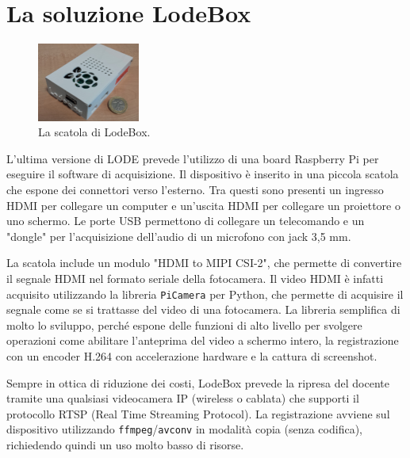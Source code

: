 \section{La soluzione LodeBox}
\label{sec:intro_lodebox}

\begin{figure}
	\vspace{-12pt}
	\includegraphics[width=0.3\textwidth]{res/lodebox}
	\caption{\label{fig:lodebox} La scatola di LodeBox.}
\end{figure}

L'ultima versione di LODE prevede l'utilizzo di una board Raspberry Pi per eseguire il software di acquisizione. Il dispositivo è inserito in una piccola scatola che espone dei connettori verso l'esterno. Tra questi sono presenti un ingresso HDMI per collegare un computer e un'uscita HDMI per collegare un proiettore o uno schermo. Le porte USB permettono di collegare un telecomando e un "dongle" per l'acquisizione dell'audio di un microfono con jack 3,5 mm.

La scatola include un modulo "HDMI to MIPI CSI-2", che permette di convertire il segnale HDMI nel formato seriale della fotocamera. Il video HDMI è infatti acquisito utilizzando la libreria \texttt{PiCamera} per Python, che permette di acquisire il segnale come se si trattasse del video di una fotocamera. La libreria semplifica di molto lo sviluppo, perché espone delle funzioni di alto livello per svolgere operazioni come abilitare l'anteprima del video a schermo intero, la registrazione con un encoder H.264\footnotemark{} con accelerazione hardware e la cattura di screenshot.


Sempre in ottica di riduzione dei costi, LodeBox prevede la ripresa del docente tramite una qualsiasi videocamera IP (wireless o cablata) che supporti il protocollo RTSP (Real Time Streaming Protocol). La registrazione avviene sul dispositivo utilizzando \texttt{ffmpeg}/\texttt{avconv}\footnotemark{} in modalità copia (senza codifica), richiedendo quindi un uso molto basso di risorse.

